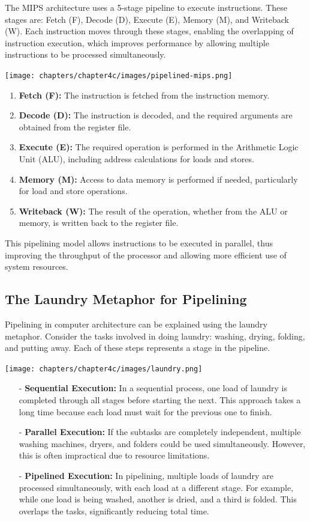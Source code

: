 The MIPS architecture uses a 5-stage pipeline to execute instructions. These stages are: Fetch (F), Decode (D), Execute (E), Memory (M), and Writeback (W). Each instruction moves through these stages, enabling the overlapping of instruction execution, which improves performance by allowing multiple instructions to be processed simultaneously.
\begin{center}
    \texttt{[image: chapters/chapter4c/images/pipelined-mips.png]}
\end{center}
\begin{enumerate}
    \item \textbf{Fetch (F):} The instruction is fetched from the instruction memory.
    \item \textbf{Decode (D):} The instruction is decoded, and the required arguments are obtained from the register file.
    \item \textbf{Execute (E):} The required operation is performed in the Arithmetic Logic Unit (ALU), including address calculations for loads and stores.
    \item \textbf{Memory (M):} Access to data memory is performed if needed, particularly for load and store operations.
    \item \textbf{Writeback (W):} The result of the operation, whether from the ALU or memory, is written back to the register file.
\end{enumerate}

This pipelining model allows instructions to be executed in parallel, thus improving the throughput of the processor and allowing more efficient use of system resources.

\subsection{The Laundry Metaphor for Pipelining}
Pipelining in computer architecture can be explained using the laundry metaphor. Consider the tasks involved in doing laundry: washing, drying, folding, and putting away. Each of these steps represents a stage in the pipeline.
\begin{center}
    \texttt{[image: chapters/chapter4c/images/laundry.png]}
\end{center}
\begin{itemize}
    \item[-] \textbf{Sequential Execution:} In a sequential process, one load of laundry is completed through all stages before starting the next. This approach takes a long time because each load must wait for the previous one to finish.
    \item[-] \textbf{Parallel Execution:} If the subtasks are completely independent, multiple washing machines, dryers, and folders could be used simultaneously. However, this is often impractical due to resource limitations.
    \item[-] \textbf{Pipelined Execution:} In pipelining, multiple loads of laundry are processed simultaneously, with each load at a different stage. For example, while one load is being washed, another is dried, and a third is folded. This overlaps the tasks, significantly reducing total time.
\end{itemize}


